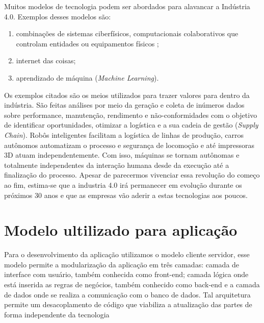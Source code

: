 \documentclass[../../layout.tex]{subfiles}
\begin{document}
\hspace*{3em}Muitos modelos de tecnologia podem ser abordados para alavancar a Indústria 4.0. Exemplos desses modelos são:
\begin{enumerate}[label=\alph*)]
\itemsep0em
    \item combinações de sistemas ciberfísicos, computacionais colaborativos que controlam entidades ou equipamentos físicos ;
    \item internet das coisas;
    \item aprendizado de máquina (\emph{Machine Learning}).
\end{enumerate}

\hspace*{3em}Os exemplos citados são os meios utilizados para trazer valores para dentro da indústria.  São feitas análises por meio da geração e coleta de inúmeros dados sobre performance, manutenção, rendimento e não-conformidades com o objetivo de identificar oportunidades, otimizar a logística e a sua cadeia de gestão (\emph{Supply Chain}). Robôs inteligentes facilitam a logística de linhas de produção, carros autônomos automatizam o processo e segurança de locomoção e até impressoras 3D atuam independentemente. Com isso, máquinas se tornam autônomas e totalmente independentes da interação humana desde da execução até a finalização do processo. Apesar de parecermos vivenciar essa revolução do começo ao fim, estima-se que a industria 4.0 irá permanecer em evolução durante os próximos 30 anos e que as empresas vão aderir a estas tecnologias aos poucos.

\section{Modelo ultilizado para aplicação}
\hspace*{3em}Para o desenvolvimento da aplicação  utilizamos o modelo cliente servidor, esse modelo permite a modularização da aplicação  em três camadas:  camada de interface com usuário, também conhecida como front-end; camada lógica onde está inserida as regras de negócios, também conhecido como back-end e a camada de dados  onde se realiza a comunicação com o banco de dados. Tal arquitetura permite um desacoplamento de código que viabiliza a atualização das partes de forma independente da tecnologia \cite{3layers}
\end{document}
